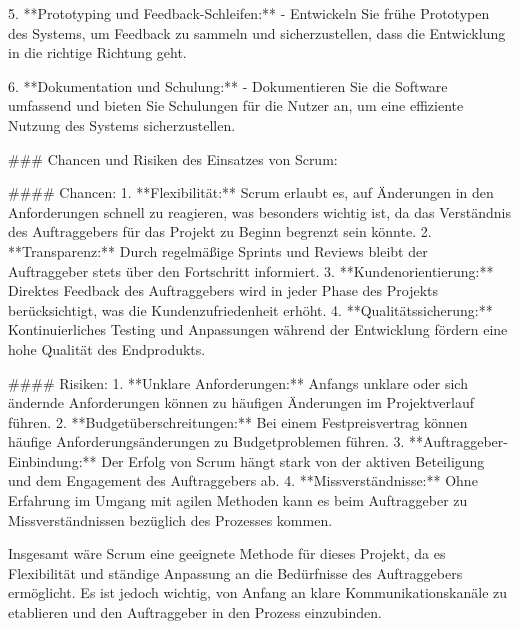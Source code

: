 \documentclass[main.tex]{subfiles}
\begin{document}
5. **Prototyping und Feedback-Schleifen:**
   - Entwickeln Sie frühe Prototypen des Systems, um Feedback zu sammeln und sicherzustellen, dass die Entwicklung in die richtige Richtung geht.

6. **Dokumentation und Schulung:**
   - Dokumentieren Sie die Software umfassend und bieten Sie Schulungen für die Nutzer an, um eine effiziente Nutzung des Systems sicherzustellen.

### Chancen und Risiken des Einsatzes von Scrum:

#### Chancen:
1. **Flexibilität:** Scrum erlaubt es, auf Änderungen in den Anforderungen schnell zu reagieren, was besonders wichtig ist, da das Verständnis des Auftraggebers für das Projekt zu Beginn begrenzt sein könnte.
2. **Transparenz:** Durch regelmäßige Sprints und Reviews bleibt der Auftraggeber stets über den Fortschritt informiert.
3. **Kundenorientierung:** Direktes Feedback des Auftraggebers wird in jeder Phase des Projekts berücksichtigt, was die Kundenzufriedenheit erhöht.
4. **Qualitätssicherung:** Kontinuierliches Testing und Anpassungen während der Entwicklung fördern eine hohe Qualität des Endprodukts.

#### Risiken:
1. **Unklare Anforderungen:** Anfangs unklare oder sich ändernde Anforderungen können zu häufigen Änderungen im Projektverlauf führen.
2. **Budgetüberschreitungen:** Bei einem Festpreisvertrag können häufige Anforderungsänderungen zu Budgetproblemen führen.
3. **Auftraggeber-Einbindung:** Der Erfolg von Scrum hängt stark von der aktiven Beteiligung und dem Engagement des Auftraggebers ab.
4. **Missverständnisse:** Ohne Erfahrung im Umgang mit agilen Methoden kann es beim Auftraggeber zu Missverständnissen bezüglich des Prozesses kommen.

Insgesamt wäre Scrum eine geeignete Methode für dieses Projekt, da es Flexibilität und ständige Anpassung an die Bedürfnisse des Auftraggebers ermöglicht. Es ist jedoch wichtig, von Anfang an klare Kommunikationskanäle zu etablieren und den Auftraggeber in den Prozess einzubinden.
\end{document}
